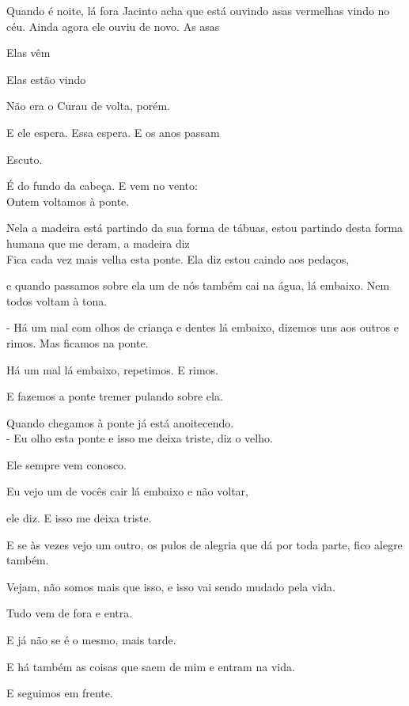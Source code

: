 Quando é noite, lá fora Jacinto acha que está ouvindo asas vermelhas
vindo no céu. Ainda agora ele ouviu de novo. As asas

Elas vêm

Elas estão vindo

Não era o Curau de volta, porém.

E ele espera. Essa espera. E os anos passam

\pagebreak

\clearpage
\thispagestyle{empty}

\movetooddpage

Escuto.

É do fundo da cabeça. E vem no vento:\\

Ontem voltamos à ponte.

Nela a madeira está partindo da sua forma de tábuas, estou partindo
desta forma humana que me deram, a madeira diz\\

Fica cada vez mais velha esta ponte. Ela diz estou caindo aos pedaços,

e quando passamos sobre ela um de nós também cai na água, lá embaixo.
Nem todos voltam à tona.

- Há um mal com olhos de criança e dentes lá embaixo, dizemos uns aos
outros e rimos. Mas ficamos na ponte.

Há um mal lá embaixo, repetimos. E rimos.

E fazemos a ponte tremer pulando sobre ela.

Quando chegamos à ponte já está anoitecendo.\\

- Eu olho esta ponte e isso me deixa triste, diz o velho.

Ele sempre vem conosco.

Eu vejo um de vocês cair lá embaixo e não voltar,

ele diz. E isso me deixa triste.

E se às vezes vejo um outro, os pulos de alegria que dá por toda parte,
fico alegre também.

Vejam, não somos mais que isso, e isso vai sendo mudado pela vida.

Tudo vem de fora e entra.

E já não se é o mesmo, mais tarde.

E há também as coisas que saem de mim e entram na vida.

E seguimos em frente.


